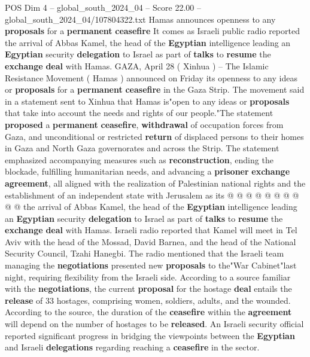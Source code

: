 \begin{textsample}{POS Dim 4 – global\_south\_2024\_04 – Score 22.00 – global\_south\_2024\_04/107804322.txt}  \label{ex:f4_pos_262}
Hamas announces openness to any \textbf{proposals} for a \textbf{permanent} \textbf{ceasefire} It comes as Israeli public radio reported the arrival of Abbas Kamel, the head of the \textbf{Egyptian} intelligence leading an \textbf{Egyptian} security \textbf{delegation} to Israel as part of \textbf{talks} to \textbf{resume} the \textbf{exchange} \textbf{deal} with Hamas.
GAZA, April 28 ( Xinhua ) -- The Islamic Resistance Movement ( Hamas ) announced on Friday its openness to any ideas or \textbf{proposals} for a \textbf{permanent} \textbf{ceasefire} in the Gaza Strip.
The movement said in a statement sent to Xinhua that Hamas is"open to any ideas or \textbf{proposals} that take into account the needs and rights of our people."The statement \textbf{proposed} a \textbf{permanent} \textbf{ceasefire}, \textbf{withdrawal} of occupation forces from Gaza, and unconditional or restricted \textbf{return} of displaced persons to their homes in Gaza and North Gaza governorates and across the Strip.
The statement emphasized accompanying measures such as \textbf{reconstruction}, ending the blockade, fulfilling humanitarian needs, and advancing a \textbf{prisoner} \textbf{exchange} \textbf{agreement}, all aligned with the realization of Palestinian national rights and the establishment of an independent state with Jerusalem as its @ @ @ @ @ @ @ @ @ @ the arrival of Abbas Kamel, the head of the \textbf{Egyptian} intelligence leading an \textbf{Egyptian} security \textbf{delegation} to Israel as part of \textbf{talks} to \textbf{resume} the \textbf{exchange} \textbf{deal} with Hamas.
Israeli radio reported that Kamel will meet in Tel Aviv with the head of the Mossad, David Barnea, and the head of the National Security Council, Tzahi Hanegbi.
The radio mentioned that the Israeli team managing the \textbf{negotiations} presented new \textbf{proposals} to the"War Cabinet"last night, requiring flexibility from the Israeli side.
According to a source familiar with the \textbf{negotiations}, the current \textbf{proposal} for the hostage \textbf{deal} entails the \textbf{release} of 33 hostages, comprising women, soldiers, adults, and the wounded.
According to the source, the duration of the \textbf{ceasefire} within the \textbf{agreement} will depend on the number of hostages to be \textbf{released}.
An Israeli security official reported significant progress in bridging the viewpoints between the \textbf{Egyptian} and Israeli \textbf{delegations} regarding reaching a \textbf{ceasefire} in the sector.

\end{textsample}
